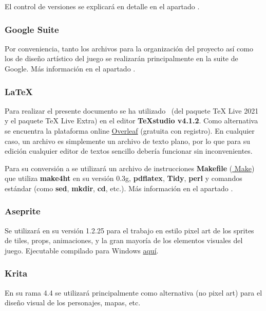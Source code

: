 El control de versiones se explicará en detalle en el apartado .

\subsubsection{Google Suite}
Por conveniencia, tanto los archivos para la organización del proyecto así como los de diseño artístico del juego se realizarán principalmente en la suite de Google. Más información en el apartado .

\subsubsection{LaTeX}
Para realizar el presente documento se ha utilizado \LaTeXe\ (del paquete TeX Live 2021 y el paquete TeX Live Extra) en el editor \textbf{TeXstudio v4.1.2}.  Como alternativa se encuentra la plataforma online \href{https://www.overleaf.com/}{Overleaf} (gratuita con registro). En cualquier caso, un archivo  es simplemente un archivo de texto plano, por lo que para su edición cualquier editor de textos sencillo debería funcionar sin inconvenientes.

Para su conversión a  se utilizará un archivo de instrucciones \textbf{Makefile} (\href{https://www.gnu.org/software/make/}{ Make}) que utiliza \textbf{make4ht} en su versión 0.3g, \textbf{pdflatex}, \textbf{Tidy}, \textbf{perl} y comandos  estándar (como \textbf{sed}, \textbf{mkdir}, \textbf{cd}, etc.). Más información en el apartado .

\subsubsection{Aseprite}
Se utilizará en su versión 1.2.25 para el trabajo en estilo pixel art de los sprites de tiles, props, animaciones,  y la gran mayoría de los elementos visuales del juego. Ejecutable compilado para Windows \href{https://drive.google.com/drive/folders/1DPhGeg7WzV9j81u3B5isgsXqoMtfd_Uv?usp=sharing}{aquí}.

\subsubsection{Krita}
En su rama 4.4 se utilizará principalmente como alternativa (no pixel art) para el diseño visual de los personajes, mapas, etc.

